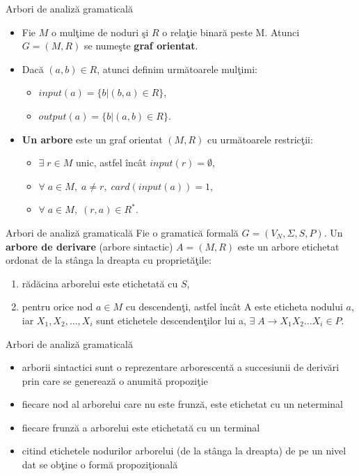 \documentclass[pdf]{beamer}
\begin{document}
\begin{frame}{Arbori de analiză gramaticală}
\begin{itemize}
\item
Fie $M$ o mulţime de noduri şi $R$ o relaţie binară peste M. Atunci $G=(M, R)$ se numeşte \textbf{graf orientat}. 
\item
Dacă $(a, b) \in R$, atunci definim următoarele mulţimi:
\begin{itemize}
\item
$input(a) = \{ b | (b, a) \in R \}$,
\item
$output(a) = \{ b | (a, b) \in R \}$.
\end{itemize}
\item
\textbf{Un arbore} este un graf orientat $(M, R)$ cu următoarele restricţii:
\begin{itemize}
\item
$\exists \; r \in M$ unic, astfel încât $input(r) = \emptyset$,
\item
$\forall \; a \in M, \; a \neq r, \; card(input(a)) = 1$,
\item
$\forall \; a \in M, \; (r, a) \in R^{*}$.
\end{itemize}
\end{itemize}
\end{frame}



\begin{frame}{Arbori de analiză gramaticală}
Fie o gramatică formală $G = (V_{N}, \Sigma, S, P )$. Un \textbf{arbore de derivare} (arbore sintactic) $A=(M, R)$ este un arbore etichetat ordonat de la stânga la dreapta cu proprietăţile:
\begin{enumerate}
\item
rădăcina arborelui este etichetată cu $S$,
\item
pentru orice nod $a \in M$ cu descendenţi, astfel încât A este eticheta nodului $a$, iar $X_{1}, X_{2}, \dots, X_{i}$ sunt etichetele descendenţilor lui a, $\exists \; A \rightarrow X_{1} X_{2} \dots X_{i} \in P$.
\end{enumerate}
\end{frame}



\begin{frame}{Arbori de analiză gramaticală}
\begin{itemize}
\item
arborii sintactici sunt o reprezentare arborescentă a succesiunii de derivări prin care se generează o anumită propoziţie
\item
fiecare nod al arborelui care nu este frunză, este etichetat cu un neterminal
\item
fiecare frunză a arborelui este etichetată cu un terminal
\item
citind etichetele nodurilor arborelui (de la stânga la dreapta) de pe un nivel dat se obţine o formă propoziţională
\end{itemize}
\end{frame}
\end{document}

